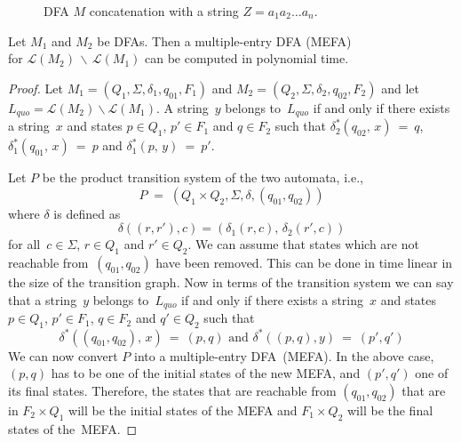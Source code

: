 \documentclass{lmcs} %
\theoremstyle{plain}\newtheorem{satz}[thm]{Satz} %
\begin{document}
\begin{appendices}
\begin{figure}
\begin{tikzpicture}[->,>=stealth',shorten >=1pt,auto,node distance=1.8cm,
                    semithick]
\end{tikzpicture}
\caption{DFA $M$ concatenation with a string $Z = a_1 a_2 \ldots a_n$.}
\label{fig:cloudDFA}
\end{figure}

\begin{lem}\label{FindMEFA}
Let $M_1^{}$ and $M_2^{}$ be DFAs. Then a multiple-entry DFA (MEFA)
\\for $\mathcal{L}(M_2^{}) \, \backslash \, \mathcal{L}(M_1^{})$ can
be computed in polynomial time.
\end{lem}

\begin{proof}
Let $M_1^{} = (Q_1^{}, \Sigma, \delta_1^{}, q_{01}^{}, F_1^{})$ and
$M_2^{} = (Q_2^{}, \Sigma, \delta_2^{}, q_{02}^{}, F_2^{})$ and 
let $L_{quo}^{} = \mathcal{L}(M_2^{}) \backslash \mathcal{L}(M_1^{})$.
A string~$y$ belongs to~$L_{quo}^{}$ if and only if
there exists a string~$x$ and states $p \in Q_1^{}$, $p' \in F_1^{}$
and $q \in F_2^{}$ such that
$\delta_{2}^* (q_{02}^{}, \, x) ~ = ~ q$,
$\delta_{1}^* (q_{01}^{}, \, x) ~ = ~ p$ and 
$\delta_{1}^* (p, \, y) ~ = ~ p'$.

Let $P$ be the product transition system of the two automata, i.e., $$P
\; = \; (Q_1^{} \times Q_2^{}, \Sigma, \delta, (q_{01}^{} ,
q_{02}^{}))$$ where $\delta$ is defined as \[ \delta((r, r'), c) = (
\delta_1^{}(r, c) , \, \delta_2^{}(r', c) ) \] for all~$c \in \Sigma$,
$r \in Q_1^{}$ and $r' \in Q_2^{}$. We can assume that states which
are not reachable from~$(q_{01}^{} , q_{02}^{})$ have been removed.
This can be done in time linear in the size of the transition graph.
Now in terms of the transition system we can say that a string~$y$
belongs to~$L_{quo}^{}$ if and only if there exists a string~$x$ and
states $p \in Q_1^{}$, $p' \in F_1^{}$, $q \in F_2^{}$ and $q' \in
Q_2^{}$ such that \[ \delta_{}^* ((q_{01}^{} , q_{02}^{}), \, x) ~ = ~
(p, q) \text{  and  } \delta_{}^*((p, q), y) ~ = ~ (p', q') \] We can now
convert $P$
into a multiple-entry DFA~(MEFA). In the above case, $(p,q)$ has to be
one of the initial states of the new MEFA, and $(p', q')$ one
of its final states. Therefore, the states that are reachable
from $(q_{01}^{} , q_{02}^{})$ that are in $F_2^{} \times Q_1^{}$ will be
the initial states of the MEFA and $F_1^{} \times Q_2^{}$ will be the
final states of the~MEFA.
\end{proof}


\end{appendices}
\end{document}
